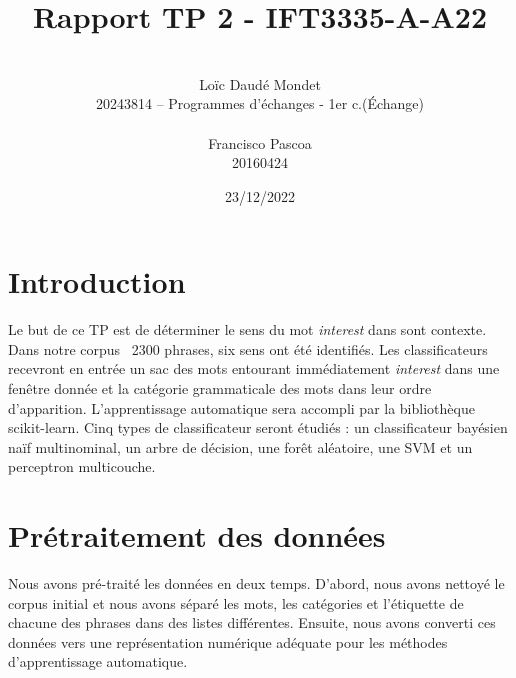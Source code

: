 \documentclass[11pt]{rapport-tp-ia}
\begin{document}
  
\title{Rapport TP 2 - IFT3335-A-A22}

\author{
	\\Loïc Daudé Mondet
	\\20243814 -- Programmes d'échanges - 1er c.(Échange)
	\\
	\\Francisco Pascoa
	\\20160424
}

\date{23/12/2022}

\maketitle

\newpage
\tableofcontents
\newpage

\chapter{Introduction}
Le but de ce TP est de déterminer le sens du mot \textit{interest} dans sont contexte.
Dans notre corpus ~2300 phrases, six sens ont été identifiés.
Les classificateurs recevront en entrée un sac des mots entourant immédiatement \textit{interest} dans une fenêtre donnée et la catégorie grammaticale des mots dans leur ordre d'apparition.
L'apprentissage automatique sera accompli par la bibliothèque scikit-learn.
Cinq types de classificateur seront étudiés : un classificateur bayésien naïf multinominal, un arbre de décision, une forêt aléatoire, une SVM et un perceptron multicouche.

\vspace{3em}
\chapter{Prétraitement des données}
Nous avons pré-traité les données en deux temps.
D'abord, nous avons nettoyé le corpus initial et nous avons séparé les mots, les catégories et l'étiquette de chacune des phrases dans des listes différentes.
Ensuite, nous avons converti ces données vers une représentation numérique adéquate pour les méthodes d'apprentissage automatique.
\end{document}
